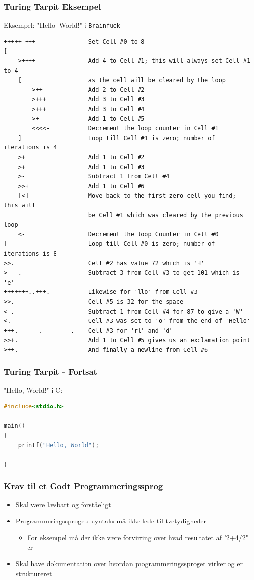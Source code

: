 \documentclass[12pt,t]{beamer}
\begin{document}
\begin{frame}[fragile]
\frametitle{Turing Tarpit Eksempel}
Eksempel: "Hello, World!" i \texttt{Brainfuck}\pause
\begin{lstlisting}[basicstyle=\tiny]
+++++ +++               Set Cell #0 to 8
[
    >++++               Add 4 to Cell #1; this will always set Cell #1 to 4
    [                   as the cell will be cleared by the loop
        >++             Add 2 to Cell #2
        >+++            Add 3 to Cell #3
        >+++            Add 3 to Cell #4
        >+              Add 1 to Cell #5
        <<<<-           Decrement the loop counter in Cell #1
    ]                   Loop till Cell #1 is zero; number of iterations is 4
    >+                  Add 1 to Cell #2
    >+                  Add 1 to Cell #3
    >-                  Subtract 1 from Cell #4
    >>+                 Add 1 to Cell #6
    [<]                 Move back to the first zero cell you find; this will
                        be Cell #1 which was cleared by the previous loop
    <-                  Decrement the loop Counter in Cell #0
]                       Loop till Cell #0 is zero; number of iterations is 8
>>.                     Cell #2 has value 72 which is 'H'
>---.                   Subtract 3 from Cell #3 to get 101 which is 'e'
+++++++..+++.           Likewise for 'llo' from Cell #3
>>.                     Cell #5 is 32 for the space
<-.                     Subtract 1 from Cell #4 for 87 to give a 'W'
<.                      Cell #3 was set to 'o' from the end of 'Hello'
+++.------.--------.    Cell #3 for 'rl' and 'd'
>>+.                    Add 1 to Cell #5 gives us an exclamation point
>++.                    And finally a newline from Cell #6
\end{lstlisting}
\end{frame}

\begin{frame}[fragile]
\frametitle{Turing Tarpit - Fortsat}
"Hello, World!" i C:\pause
\begin{lstlisting}[language=C]
#include<stdio.h>

main()
{
    printf("Hello, World");

}
\end{lstlisting}
\end{frame}

\begin{frame}
 \frametitle{Krav til et Godt Programmeringssprog}
 \begin{block}{}
  \begin{itemize}
  \item Skal være læsbart og forståeligt\\
  \item Programmeringssprogets syntaks må ikke lede til tvetydigheder
  \begin{itemize}
  \item For eksempel må der ikke være forvirring over hvad resultatet af "2+4/2" er
  \end{itemize}
  \item Skal have dokumentation over hvordan programmeringssproget virker og er
  struktureret
  \end{itemize}
 \end{block}
\end{frame}
\end{document}
